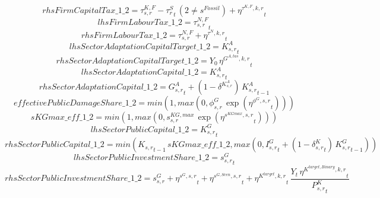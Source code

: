 \begin{dmath*}
rhsFirmCapitalTax\_1\_2 = {{\tau^{K,F}_{s,r}}}-{{\tau^{S}_{r}}}_{t}\, \left(2\neq {{s^{Fossil}}}\right)+{{\eta^{\tau^{K,F},k,r}}}_{t}
\end{dmath*}
\begin{dmath*}
lhsFirmLabourTax\_1\_2 = {{\tau^{N,F}_{s,r}}}_{t}
\end{dmath*}
\begin{dmath*}
rhsFirmLabourTax\_1\_2 = {{\tau^{N,F}_{s,r}}}+{{\eta^{\tau^{N},k,r}}}_{t}
\end{dmath*}
\begin{dmath*}
lhsSectorAdaptationCapitalTarget\_1\_2 = {{K^{A}_{s,r}}}_{t}
\end{dmath*}
\begin{dmath*}
rhsSectorAdaptationCapitalTarget\_1\_2 = {{Y_0}}\, {{\eta^{G^{A,tas},k,r}}}_{t}
\end{dmath*}
\begin{dmath*}
lhsSectorAdaptationCapital\_1\_2 = {{K^{A}_{s,r}}}_{t}
\end{dmath*}
\begin{dmath*}
rhsSectorAdaptationCapital\_1\_2 = {{G^{A}_{s,r}}}_{t}+\left(1-{{\delta^{K^{A}_{s,r}}}}\right)\, {{K^{A}_{s,r}}}_{t-1}
\end{dmath*}
\begin{dmath*}
effectivePublicDamageShare\_1\_2 = min(1,max(0,{{\phi^{G}_{s,r}}}\, \exp\left({{\eta^{\phi^{G},s,r}}}_{t}\right)))
\end{dmath*}
\begin{dmath*}
sKGmax\_eff\_1\_2 = min(1,max(0,{{s^{KG,max}_{s,r}}}\, \exp\left({{\eta^{s^{KGmax},s,r}}}_{t}\right)))
\end{dmath*}
\begin{dmath*}
lhsSectorPublicCapital\_1\_2 = {{K^G_{s,r}}}_{t}
\end{dmath*}
\begin{dmath*}
rhsSectorPublicCapital\_1\_2 = min({{K_{s,r}}}_{t-1}\, {sKGmax\_eff\_1\_2},max(0,{{I^G_{s,r}}}_{t}+\left(1-{{\delta^{K}_{s,r}}}_{t}\right)\, {{K^G_{s,r}}}_{t-1}))
\end{dmath*}
\begin{dmath*}
lhsSectorPublicInvestmentShare\_1\_2 = {{s^G_{s,r}}}_{t}
\end{dmath*}
\begin{dmath*}
rhsSectorPublicInvestmentShare\_1\_2 = {{s^{G}_{s,r}}}+{{\eta^{s^G,s,r}}}_{t}+{{\eta^{s^{G,Scen},s,r}}}_{t}+{{\eta^{K^{target},k,r}}}_{t}\, \frac{{Y}_{t}\, {{\eta^{K^{target,Binary},k,r}}}_{t}}{{{P^K_{s,r}}}_{t}}
\end{dmath*}
